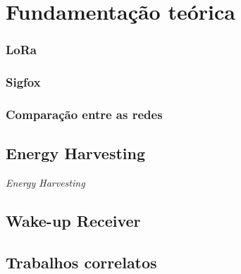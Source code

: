 \chapter{Fundamentação teórica}


\subsection{LoRa}


\subsection{Sigfox}


\subsection{Comparação entre as redes}


\section{Energy Harvesting}


\textit{Energy Harvesting} 


\section{Wake-up Receiver}


\section{Trabalhos correlatos}



